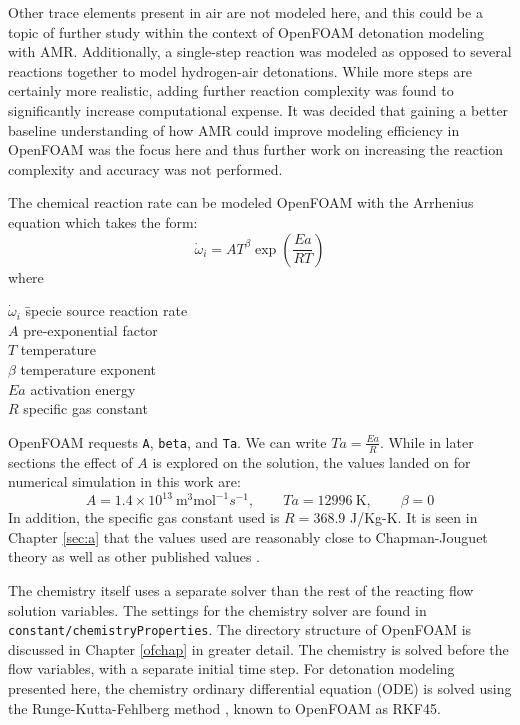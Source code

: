 Other trace elements present in air are not modeled here, and this could be a topic of further study within the context of OpenFOAM detonation modeling with AMR. Additionally, a single-step reaction was modeled as opposed to several reactions together to model hydrogen-air detonations. While more steps are certainly more realistic, adding further reaction complexity was found to significantly increase computational expense. It was decided that gaining a better baseline understanding of how AMR could improve modeling efficiency in OpenFOAM was the focus here and thus further work on increasing the reaction complexity and accuracy was not performed. 

The chemical reaction rate can be modeled OpenFOAM with the Arrhenius equation \cite{christ} which takes the form: 
\begin{equation}
\dot{\omega}_i = AT^\beta \exp\left(\frac{Ea}{R T}\right)
\end{equation}
where 
\begin{tabbing}
\qquad \= \(\dot{\omega}_i\) \qquad \= specie source reaction rate \\ 
\> \(A\) \> pre-exponential factor \\
\> \(T\) \> temperature \\
\> \(\beta\) \> temperature exponent \\
\> \(Ea\) \> activation energy \\
\> \(R\) \> specific gas constant 
\end{tabbing}

\noindent OpenFOAM requests \verb|A|, \verb|beta|, and \verb|Ta|. We can write \(Ta = \frac{Ea}{R }\). While in later sections the effect of \(A\) is explored on the solution, the values landed on for numerical simulation in this work are:
\begin{equation}
   A = 1.4 \times 10^{13} ~ \text{m}^3\text{mol}^{-1}s^{-1},
   \qquad 
   Ta = 12996 ~\text{K},
   \qquad
   \beta = 0
\end{equation}
\noindent In addition, the specific gas constant used is \(R = 368.9\) J/Kg-K. It is seen in Chapter \ref{sec:a} that the values used are reasonably close to Chapman-Jouguet theory as well as other published values \cite{towery1}\cite{hashemi}. 

The chemistry itself uses a separate solver than the rest of the reacting flow solution variables. The settings for the chemistry solver are found in \verb|constant/chemistryProperties|. The directory structure of OpenFOAM is discussed in Chapter \ref{ofchap} in greater detail. The chemistry is solved before the flow variables, with a separate initial time step. For detonation modeling presented here, the chemistry ordinary differential equation (ODE) is solved using the Runge-Kutta-Fehlberg method \cite{rkf}, known to OpenFOAM as RKF45. 



